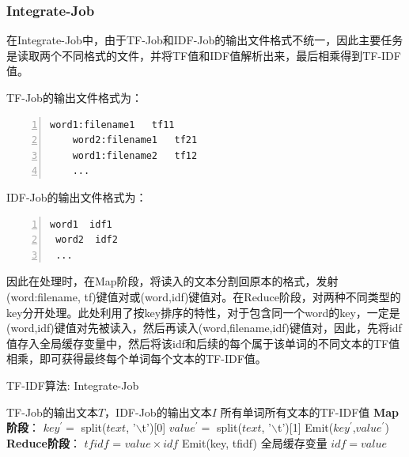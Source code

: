 \documentclass[lang=cn,11pt]{elegantpaper}
\begin{document}
\subsubsection{Integrate-Job}
在Integrate-Job中，由于TF-Job和IDF-Job的输出文件格式不统一，因此主要任务是读取两个不同格式的文件，并将TF值和IDF值解析出来，最后相乘得到TF-IDF值。\par
TF-Job的输出文件格式为：
  \begin{lstlisting}[language={[ANSI]C},numbers=left,numberstyle=\tiny,%frame=shadowbox,  
     rulesepcolor=\color{red!20!green!20!blue!20},  
     keywordstyle=\color{blue!70!black},  
     commentstyle=\color{blue!90!},  
     basicstyle=\ttfamily]  
    word1:filename1   tf11
    word2:filename1   tf21
    word1:filename2   tf12
    ...
  \end{lstlisting}\par
IDF-Job的输出文件格式为：
\begin{lstlisting}[language={[ANSI]C},numbers=left,numberstyle=\tiny,%frame=shadowbox,  
  rulesepcolor=\color{red!20!green!20!blue!20},  
  keywordstyle=\color{blue!70!black},  
  commentstyle=\color{blue!90!},  
  basicstyle=\ttfamily]  
 word1  idf1
 word2  idf2
 ...
\end{lstlisting}\par
因此在处理时，在Map阶段，将读入的文本分割回原本的格式，发射(word:filename, tf)键值对或(word,idf)键值对。在Reduce阶段，对两种不同类型的key分开处理。此处利用了按key排序的特性，对于包含同一个word的key，一定是(word,idf)键值对先被读入，然后再读入(word,filename,idf)键值对，因此，先将idf值存入全局缓存变量中，然后将该idf和后续的每个属于该单词的不同文本的TF值相乘，即可获得最终每个单词每个文本的TF-IDF值。\par
\begin{algorithm}[H]  
  \caption{TF-IDF算法: Integrate-Job}  
  \label{alg:Framwork}
  \begin{algorithmic}[1]
    \Require
    TF-Job的输出文本$T$，IDF-Job的输出文本$I$
    \Ensure
    所有单词所有文本的TF-IDF值
    \State \textbf{Map阶段}：
      \State $key^\prime=$ split($text$, '$\backslash$t')[0]
      \State $value^\prime=$ split($text$, '$\backslash$t')[1]
      \State Emit($key^\prime$,$value^\prime$)
    \EndFunction
    \State \textbf{Reduce阶段}：
        \State $tfidf$ = $value\times idf$
        \State Emit(key, tfidf)
      \Else
        \State 全局缓存变量 $idf=value$
      \EndIf
    \EndFunction
  \end{algorithmic}
\end{algorithm}
\end{document}
